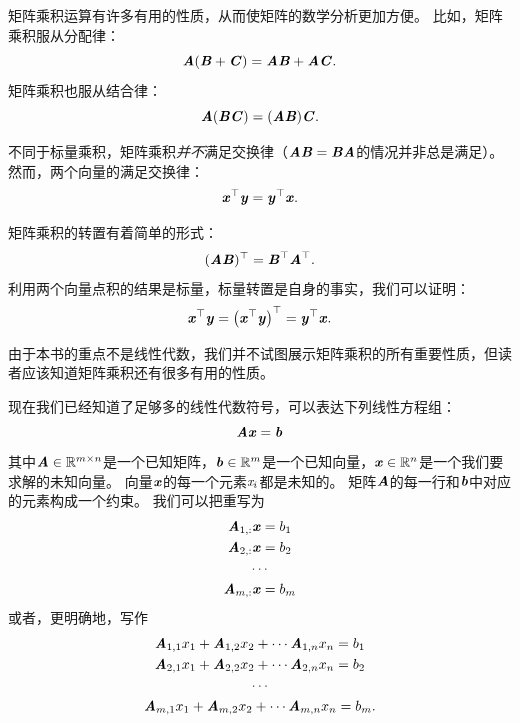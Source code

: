 矩阵乘积运算有许多有用的性质，从而使矩阵的数学分析更加方便。
比如，矩阵乘积服从分配律：
\begin{equation}
    \MA(\MB+\MC)=\MA\MB +\MA\MC.
\end{equation}
矩阵乘积也服从结合律：
\begin{equation}
\MA(\MB\MC)=(\MA\MB)\MC.
\end{equation}




不同于标量乘积，矩阵乘积\emph{并不}满足交换律（$\MA\MB=\MB\MA$的情况并非总是满足）。
然而，两个向量的满足交换律：
\begin{equation}
\Vx^\top\Vy=\Vy^\top\Vx.
\label{eq:2.8}
\end{equation}


矩阵乘积的转置有着简单的形式：
\begin{equation}
(\MA\MB)^\top=\MB^\top\MA^\top.
\end{equation}
利用两个向量点积的结果是标量，标量转置是自身的事实，我们可以证明：
\begin{equation}
    \Vx^\top \Vy = \left(\Vx^\top \Vy \right)^\top = \Vy^\top \Vx.
\end{equation}


由于本书的重点不是线性代数，我们并不试图展示矩阵乘积的所有重要性质，但读者应该知道矩阵乘积还有很多有用的性质。


现在我们已经知道了足够多的线性代数符号，可以表达下列线性方程组：
\begin{equation}
\MA\Vx=\Vb
\label{eq:2.11}
\end{equation}
其中$\MA\in \SetR^{m\times n}$是一个已知矩阵，$\Vb\in\SetR^m$是一个已知向量，$\Vx\in\SetR^n$是一个我们要求解的未知向量。
向量$\Vx$的每一个元素$\Sx_i$都是未知的。
矩阵$\MA$的每一行和$\Vb$中对应的元素构成一个约束。
我们可以把重写为
\begin{gather}
\MA_{1,:}\Vx=b_1\\
\MA_{2,:}\Vx=b_2 \\
\cdots \\
\MA_{m,:}\Vx=b_m
\end{gather}
或者，更明确地，写作
\begin{gather}
    \MA_{1,1}x_1+\MA_{1,2}x_2+\cdots \MA_{1,n}x_n = b_1\\
    \MA_{2,1}x_1+\MA_{2,2}x_2+\cdots \MA_{2,n}x_n = b_2\\
    \cdots\\
    \MA_{m,1}x_1+\MA_{m,2}x_2+\cdots \MA_{m,n}x_n = b_m.
\end{gather}


